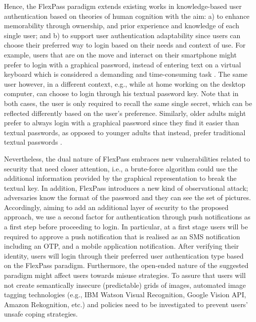 Hence, the FlexPass paradigm extends existing works in knowledge-based user authentication based on theories of human cognition with the aim: a) to enhance memorability through ownership, and prior experience and knowledge of each single user; and b) to support user authentication adaptability since users can choose their preferred way to login based on their needs and context of use. For example, users that are on the move and interact on their smartphone might prefer to login with a graphical password, instead of entering text on a virtual keyboard which is considered a demanding and time-consuming task \cite{vonzezschwitz}. The same user however, in a different context, e.g., while at home working on the desktop computer, can choose to login through his textual password key. Note that in both cases, the user is only required to recall the same single secret, which can be reflected differently based on the user’s preference. Similarly, older adults might prefer to always login with a graphical password since they find it easier than textual passwords, as opposed to younger adults that instead, prefer traditional textual passwords \cite{nicholson}.

Nevertheless, the dual nature of FlexPass embraces new vulnerabilities related to security that need closer attention, i.e., a brute-force algorithm could use the additional information provided by the graphical representation to break the textual key. In addition, FlexPass introduces a new kind of observational attack; adversaries know the format of the password and they can see the set of pictures. Accordingly, aiming to add an additional layer of security to the proposed approach, we use a second factor for authentication through push notifications as a first step before proceeding to login. In particular, at a first stage users will be required to approve a push notification that is realised as an SMS notification including an OTP, and a mobile application notification. After verifying their identity, users will login through their preferred user authentication type based on the FlexPass paradigm. Furthermore, the open-ended nature of the suggested paradigm might affect users towards misuse strategies. To assure that users will not create semantically insecure (predictable) grids of images, automated image tagging technologies (e.g., IBM Watson Visual Recognition, Google Vision API, Amazon Rekognition, etc.) and policies need to be investigated to prevent users’ unsafe coping strategies. 
